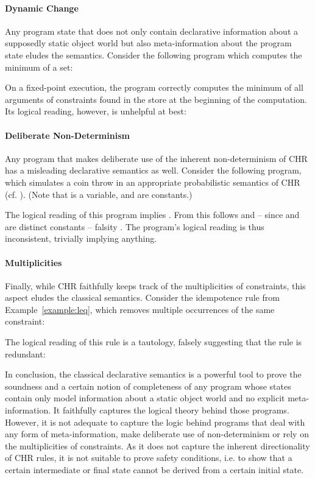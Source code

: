 \documentclass[acmtocl]{acmtrans2m}
\begin{document}
\paragraph*{Dynamic Change} Any program state that does not only
contain declarative information about a supposedly static object world but also
meta-information about the program state eludes the semantics. Consider the
following program which computes the minimum of a set:

On a fixed-point execution, the program correctly computes the minimum of all
arguments of  constraints found in the store at the beginning of the
computation. Its logical reading, however, is unhelpful at best:


\paragraph*{Deliberate Non-Determinism} Any program that makes deliberate use of
the inherent non-determinism of CHR has a misleading declarative semantics as
well. Consider the following program, which simulates a coin throw in an appropriate
probabilistic semantics of CHR (cf. ).
(Note that  is a variable,  and  are constants.)

The logical reading of this program implies . From this follows  and -- since
 and  are distinct constants -- falsity . The program's logical
reading is thus inconsistent, trivially implying anything.

\paragraph*{Multiplicities} Finally, while CHR faithfully keeps track of the
multiplicities of constraints, this aspect eludes the classical semantics.
Consider the idempotence rule from Example~\ref{example:leq}, which removes
multiple occurrences of the same constraint:

The logical reading of this rule is a tautology, falsely suggesting that
the rule is redundant:

In conclusion, the classical declarative semantics is a powerful tool to prove
the soundness and a certain notion of completeness of any program whose states
contain only model information about a static object world and no explicit
meta-information. It faithfully captures the logical theory behind those
programs. However, it is not adequate to capture the logic behind programs that
deal with any form of meta-information, make deliberate use of non-determinism or
rely on the multiplicities of constraints. As it does not capture the inherent
directionality of CHR rules, it is not suitable to prove safety conditions, i.e.
to show that a certain intermediate or final state cannot be derived from a
certain initial state.
\end{document}
